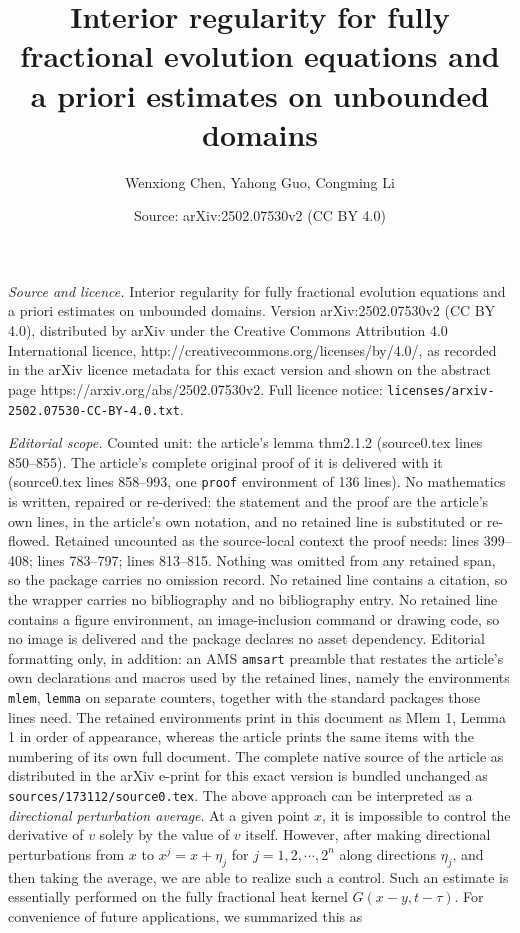 \documentclass[10pt,a4paper]{amsart}
\title{Interior regularity for fully fractional evolution equations and a priori estimates on unbounded domains}
\author{Wenxiong Chen, Yahong Guo, Congming Li}
\date{Source: arXiv:2502.07530v2 (CC BY 4.0)}
\begin{document}
\maketitle

\noindent\emph{Source and licence.} Interior regularity for fully fractional evolution equations and a priori estimates on unbounded domains. Version arXiv:2502.07530v2 (CC BY 4.0), distributed by arXiv under the Creative Commons Attribution 4.0 International licence, http://creativecommons.org/licenses/by/4.0/, as recorded in the arXiv licence metadata for this exact version and shown on the abstract page https://arxiv.org/abs/2502.07530v2. Full licence notice: \texttt{licenses/arxiv-2502.07530-CC-BY-4.0.txt}.\par\smallskip

\noindent\textit{Editorial scope.} Counted unit: the article's lemma thm2.1.2 (source0.tex lines 850--855). The article's complete original proof of it is delivered with it (source0.tex lines 858--993, one \texttt{proof} environment of 136 lines). No mathematics is written, repaired or re-derived: the statement and the proof are the article's own lines, in the article's own notation, and no retained line is substituted or re-flowed.  Retained uncounted as the source-local context the proof needs: lines 399--408; lines 783--797; lines 813--815.  Nothing was omitted from any retained span, so the package carries no omission record.  No retained line contains a citation, so the wrapper carries no bibliography and no bibliography entry.  No retained line contains a figure environment, an image-inclusion command or drawing code, so no image is delivered and the package declares no asset dependency.  Editorial formatting only, in addition: an AMS \texttt{amsart} preamble that restates the article's own declarations and macros used by the retained lines, namely the environments \texttt{mlem}, \texttt{lemma} on separate counters, together with the standard packages those lines need.  The retained environments print in this document as Mlem 1, Lemma 1 in order of appearance, whereas the article prints the same items with the numbering of its own full document.  The complete native source of the article as distributed in the arXiv e-print for this exact version is bundled unchanged as \texttt{sources/173112/source0.tex}.
The above approach can be interpreted as a {\em directional perturbation average}. At a given point $x$, it is impossible to control the derivative of $v$ solely by the value of $v$ itself. However, after making directional perturbations from $x$ to $x^j = x + \eta_j$ for $ j=1,2, \cdots, 2^n$ along directions $\eta_j$, and then taking the average, we are able to realize such a control. Such an estimate is essentially performed on the fully fractional heat kernel $G(x-y, t-\tau)$. For convenience of future applications, we summarized this as
\end{document}
